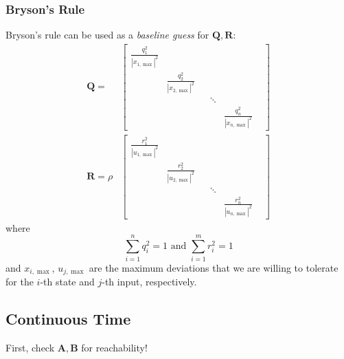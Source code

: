 \subsubsection{Bryson's Rule}
Bryson's rule can be used as a \textit{baseline guess} for $\mathbf{Q,R}$:
\noindent\begin{align*}
    \mathbf{Q} =
     & \begin{bmatrix}\frac{q_1^2}{|x_{1,\max}|^2} &                              &  &        &                              & \\
                                            & \frac{q_2^2}{|x_{2,\max}|^2} &  &        &                              & \\
                                            &                              &  & \ddots &                              & \\
                                            &                              &  &        & \frac{q_n^2}{|x_{n,\max}|^2}
       \end{bmatrix} \\
    \mathbf{R} = \rho
     & \begin{bmatrix}\frac{r_1^2}{|u_{1,\max}|^2} &                              &  &        &                              & \\
                                            & \frac{r_2^2}{|u_{2,\max}|^2} &  &        &                              & \\
                                            &                              &  & \ddots &                              & \\
                                            &                              &  &        & \frac{r_n^2}{|u_{n,\max}|^2}
       \end{bmatrix}
\end{align*}
where
\noindent\begin{equation*}
    \sum_{i=1}^n q_i^2=1\text{ and }\sum_{i=1}^m r_i^2=1
\end{equation*}
and $x_{i,\max}$, $u_{j,\max}$ are the maximum deviations that we are willing to tolerate for the $i$-th state and $j$-th input, respectively.

\subsection{Continuous Time}
First, check $\mathbf{A,B}$ for reachability!

